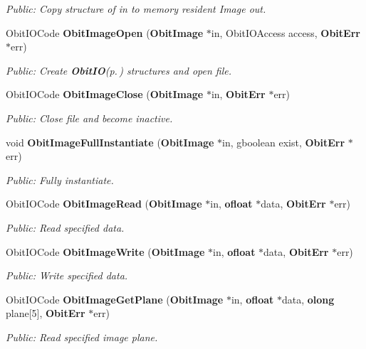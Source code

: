 \begin{CompactItemize}
\begin{CompactList}\small\item\em Public: Copy structure of in to memory resident Image out. \item\end{CompactList}\item 
Obit\-IOCode {\bf Obit\-Image\-Open} ({\bf Obit\-Image} $\ast$in, Obit\-IOAccess access, {\bf Obit\-Err} $\ast$err)
\begin{CompactList}\small\item\em Public: Create {\bf Obit\-IO}{\rm (p.\,\pageref{structObitIO})} structures and open file. \item\end{CompactList}\item 
Obit\-IOCode {\bf Obit\-Image\-Close} ({\bf Obit\-Image} $\ast$in, {\bf Obit\-Err} $\ast$err)
\begin{CompactList}\small\item\em Public: Close file and become inactive. \item\end{CompactList}\item 
void {\bf Obit\-Image\-Full\-Instantiate} ({\bf Obit\-Image} $\ast$in, gboolean exist, {\bf Obit\-Err} $\ast$err)
\begin{CompactList}\small\item\em Public: Fully instantiate. \item\end{CompactList}\item 
Obit\-IOCode {\bf Obit\-Image\-Read} ({\bf Obit\-Image} $\ast$in, {\bf ofloat} $\ast$data, {\bf Obit\-Err} $\ast$err)
\begin{CompactList}\small\item\em Public: Read specified data. \item\end{CompactList}\item 
Obit\-IOCode {\bf Obit\-Image\-Write} ({\bf Obit\-Image} $\ast$in, {\bf ofloat} $\ast$data, {\bf Obit\-Err} $\ast$err)
\begin{CompactList}\small\item\em Public: Write specified data. \item\end{CompactList}\item 
Obit\-IOCode {\bf Obit\-Image\-Get\-Plane} ({\bf Obit\-Image} $\ast$in, {\bf ofloat} $\ast$data, {\bf olong} plane[5], {\bf Obit\-Err} $\ast$err)
\begin{CompactList}\small\item\em Public: Read specified image plane. \item\end{CompactList}\item 

\end{CompactItemize}
